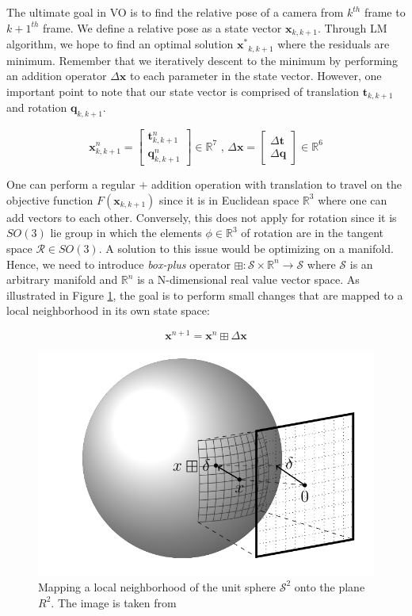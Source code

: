 \documentclass[a4paper]{report}
\numberwithin{figure}{section}
\newcommand{\R}{\mathbb{R}}
\begin{document}
\begin{appendices}
The ultimate goal in VO is to find the relative pose of a camera from 
$k^{th}$ frame to $k+1^{th}$ frame. 
We define a relative pose as a state vector $\mathbf{x}_{k,k+1}$. 
Through LM algorithm, we hope to 
find an optimal solution $\mathbf{x^*}_{k,k+1}$ where the residuals are 
minimum.
Remember that we iteratively descent to the minimum by performing an 
addition operator $\Delta \mathbf{x}$ to each parameter in the state vector. 
However, one important point to note that our state vector is comprised of 
translation $\mathbf{t}_{k,k+1}$ and rotation $\mathbf{q}_{k,k+1}$. 

\begin{equation}
  \mathbf{x}^n_{k,k+1} = \begin{bmatrix} \mathbf{t}^n_{k,k+1} \\ \mathbf{q}^n_{k,k+1} \end{bmatrix} \in \R^7
  \text{ ,   } 
  \Delta \mathbf{x} = \begin{bmatrix} \Delta \mathbf{t} \\ \Delta \mathbf{q} \end{bmatrix} \in \R^6
\end{equation}

One can perform a regular $+$ addition operation with translation 
to travel on the objective function $F(\mathbf{x}_{k,k+1})$ since 
it is in Euclidean space $\R^3$ where one can add vectors to each other. 
Conversely, this does not apply for rotation 
since it is $SO(3)$ lie group in which the elements $\phi \in \R^3$ of rotation 
are in the tangent space $\mathcal{R} \in SO(3)$.
A solution to this issue would be optimizing on a manifold.
Hence, we need to introduce \textit{box-plus} operator
$\boxplus : \mathcal{S} \times \R^n \rightarrow \mathcal{S}$ where $\mathcal{S}$ 
is an arbitrary manifold and $\R^n$ is a N-dimensional real value vector space. 
As illustrated in Figure \ref{fig:manifold}, 
the goal is to perform small changes that are mapped to a local neighborhood in 
its own state space:

\begin{equation}
  \mathbf{x}^{n+1} = \mathbf{x}^{n} \boxplus \Delta \mathbf{x}
\end{equation}

\begin{figure}[H]
	\centering
  \includegraphics[width=0.5\linewidth,natwidth=640,natheight=640]
  {fig/ref_imgs/sphere_manifold.png}
  \caption[A Sphere Manifold]
  {Mapping a local neighborhood of the unit sphere $\mathcal{S}^2$ 
  onto the plane $R^2$. The image is taken from \parencite{Hertzberg2013}}
	\label{fig:manifold}
\end{figure}



\end{appendices}
\end{document}
